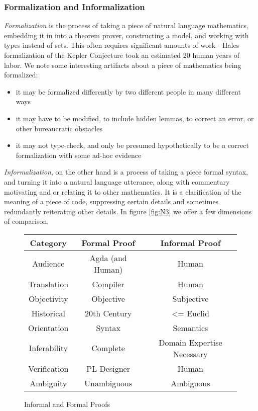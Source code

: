 \subsubsection{Formalization and Informalization}

\emph{Formalization} is the process of taking a piece of natural language
mathematics, embedding it in into a theorem prover, constructing a model, and
working with types instead of sets. This often requires significant amounts of
work - Hales formalization of the Kepler Conjecture took an estimated 20 human
years of labor. We note some interesting artifacts about a piece of mathematics
being formalized:

\begin{itemize}
\item it may be formalized differently by two different people in many different ways
\item it may have to be modified, to include hidden lemmas, to correct an
  error, or other bureaucratic obstacles
\item it may not type-check, and only be presumed hypothetically to be a
  correct formalization with some ad-hoc evidence 
\end{itemize}

\emph{Informalization}, on the other hand is a process of taking a piece formal
syntax, and turning it into a natural language utterance, along with commentary
motivating and or relating it to other mathematics. It is a clarification of the
meaning of a piece of code, suppressing certain details and sometimes
redundantly reiterating other details. In figure \autoref{fig:N3} we offer a few
dimensions of comparison.

\begin{figure}
\centering
\begin{tabular}{|c|c|c|} \hline
  Category & Formal Proof & Informal Proof \\ \hline
  Audience & Agda (and Human) & Human \\ \hline
  Translation & Compiler & Human \\ \hline
  Objectivity & Objective & Subjective \\ \hline %
  Historical & 20th Century & <= Euclid \\ \hline
  Orientation & Syntax & Semantics \\ \hline
  Inferability & Complete & Domain Expertise Necessary \\ \hline
  Verification & PL Designer & Human \\ \hline
  Ambiguity & Unambiguous & Ambiguous \\ \hline

\end{tabular}
\caption{Informal and Formal Proofs} \label{fig:N3}
\end{figure}

